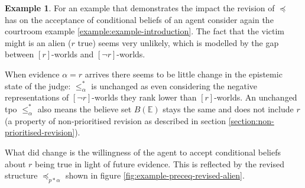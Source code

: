 \documentclass[english, 12pt]{scrartcl}
\theoremstyle{definition}
\newtheorem{example}{Example}[section]
\theoremstyle{definition}
\theoremstyle{definition}
\begin{document}
\begin{example}
    \label{example:example-preceq-revised-alien}
    For an example that demonstrates the impact the revision of $\preceq$ has on the acceptance of conditional beliefs of an agent consider again the courtroom example \ref{example:example-introduction}. The fact that the victim might is an alien ($r$ true) seems very unlikely, which is modelled by the gap between $[r]$-worlds and $[\neg r]$-worlds.
    
    When evidence $\alpha = r$ arrives there seems to be little change in the epistemic state of the judge: $\leq_{\alpha}^{\ast}$ is unchanged as even considering the negative representations of $[\neg r]$-worlds they rank lower than $[r]$-worlds. An unchanged tpo $\leq_{\alpha}^{\ast}$ also means the believe set $B(\mathbb{E})$ stays the same and does not include $r$ (a property of non-prioritised revision as described in section \ref{section:non-prioritised-revision}).
    
    What did change is the willingness of the agent to accept conditional beliefs about $r$ being true in light of future evidence. This is reflected by the revised structure $\preceq_{p \ast \alpha}$ shown in figure \ref{fig:example-preceq-revised-alien}.

    \begin{figure}[h]
            \centering
\end{figure}
\end{example}
\end{document}
